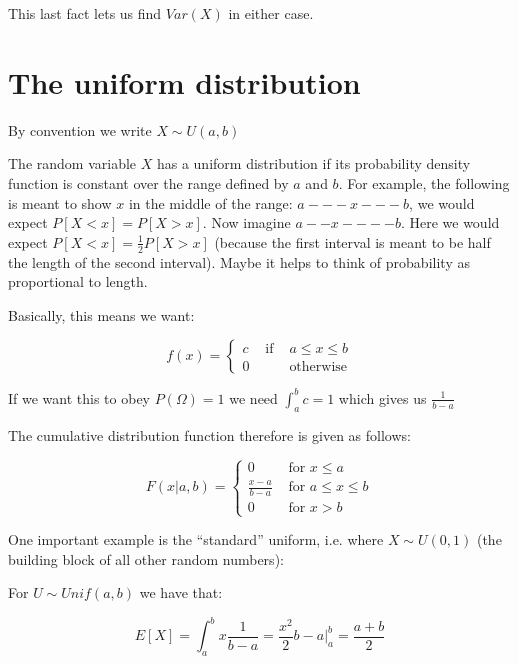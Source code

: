\documentclass[12pt]{extbook}
\begin{document}
This last fact lets us find $Var(X)$ in either case.





\section{The uniform distribution}

{\color{green}By convention we write $X \sim U(a, b)$}


The random variable $X$ has a uniform distribution if its probability density function is constant over the range defined by $a$ and $b$.   For example, the following is meant to show $x$ in the middle of the range: $a---x---b$, we would expect $P[X<x]=P[X>x]$.   Now imagine $a--x----b$.  Here we would expect $P[X<x] =  \frac{1}{2}P[X>x]$ (because the first interval is meant to be half the length of the second interval).   Maybe it helps to think of probability as proportional to length.

Basically, this means we want:

\begin{displaymath}
f(x) = \left\{ \begin{array}{rrr} c & \mbox{ if } & a \leq x \leq b\\
0 & & \mbox{otherwise} \end{array} \right.
\end{displaymath}

If we want this to obey $P(\Omega)=1$ we need $\int_a^bc=1$ which gives us $\frac{1}{b-a}$

  The cumulative distribution function therefore is given as follows:

\begin{displaymath}
F(x|a,b) = \left\{ \begin{array}{ll} 0 & \mbox{ for }  x \leq a \\
\frac{x-a}{b-a} & \mbox{ for } a \leq x \leq b \\ 
0 & \mbox{ for } x > b \end{array} \right.
\end{displaymath}



One important example is the ``standard'' uniform, i.e. where $X \sim U(0,1)$ (the building block of all other random numbers):

For $U \sim Unif(a,b)$ we have that:

\begin{displaymath}
E[X] = \int_a^b x \frac{1}{b-a} = \frac{x^2}{2}b-a|^b_a=\frac{a+b}{2}
\end{displaymath}
\end{document}

